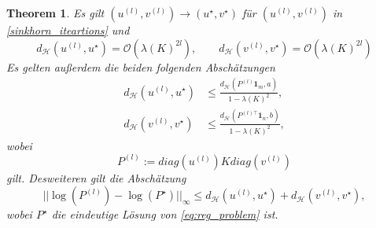 \documentclass[twoside, 12pt,a4paper]{book}
\newtheorem{theorem}{Theorem}[subsection]
\numberwithin{equation}{section}
\begin{document}
	\begin{theorem}\cite{COTcuturi}
		Es gilt $(u^{(l)}, v^{(l)})\to (u^\star, v^\star)$  für $(u^{(l)}, v^{(l)})$ in \eqref{sinkhorn_iteartions} und
		\begin{equation}
		d_{\mathcal{H}}(u^{(l)}, u^\star) = \mathcal{O}(\lambda(K)^{2l}), \qquad d_\mathcal{H}(v^{(l)},v^\star) = \mathcal{O}(\lambda (K)^{2l}) \label{eq:erstesResThm42}
		\end{equation}
		Es gelten außerdem die beiden folgenden Abschätzungen
		\begin{align}
		d_\mathcal{H} (u^{(l)}, u^\star) &\leq \frac{d_\mathcal{H}(P^{(l)}\boldsymbol{1}_m, a)}{1-\lambda(K)^2}, \label{eq:thm42zweiAbschätzungen1}\\
		d_\mathcal{H} (v^{(l)}, v^\star) &\leq \frac{d_\mathcal{H}(P^{(l)\top}\boldsymbol{1}_n, b)}{1-\lambda(K)^2}, \label{eq:thm42zweiAbschätzungen}		
		\end{align}
		wobei \begin{equation}
		P^{(l)} := diag(u^{(l)})K diag(v^{(l)}) \label{eq:reconstruction_TransportPlan}
		\end{equation}
		gilt. Desweiteren gilt die Abschätzung
		\begin{equation}
		|| \log(P^{(l)}) - \log (P^\star)||_\infty \leq d_\mathcal{H} (u^{(l)}, u^\star) + d_\mathcal{H} (v^{(l)}, v^\star), \label{eq:thm42letzteAbschätzung}
		\end{equation}
		wobei $P^\star$ die eindeutige Lösung von \autoref{eq:reg_problem} ist.
	\end{theorem}
\end{document}
